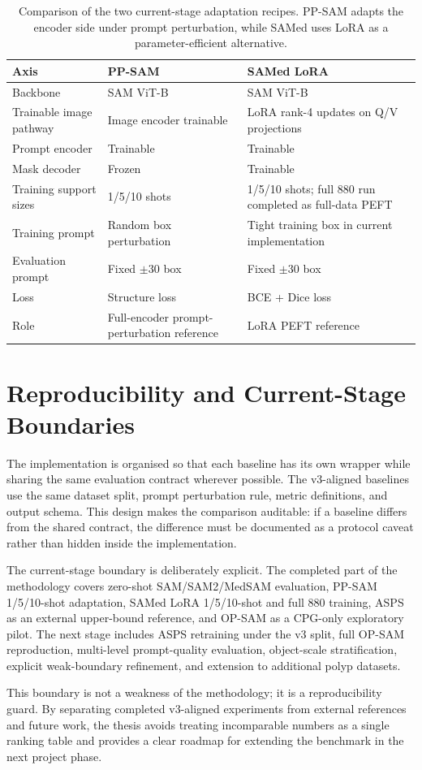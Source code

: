 \begin{table}[H]
\centering
\caption{Comparison of the two current-stage adaptation recipes. PP-SAM adapts the encoder side under prompt perturbation, while SAMed uses LoRA as a parameter-efficient alternative.}
\label{tab:adaptation-recipes}
\begin{tabular}{p{3.3cm}p{5.2cm}p{5.2cm}}
\toprule
\textbf{Axis} & \textbf{PP-SAM} & \textbf{SAMed LoRA} \\
\midrule
Backbone & SAM ViT-B & SAM ViT-B \\
Trainable image pathway & Image encoder trainable & LoRA rank-4 updates on Q/V projections \\
Prompt encoder & Trainable & Trainable \\
Mask decoder & Frozen & Trainable \\
Training support sizes & 1/5/10 shots & 1/5/10 shots; full 880 run completed as full-data PEFT \\
Training prompt & Random box perturbation & Tight training box in current implementation \\
Evaluation prompt & Fixed $\pm30$ box & Fixed $\pm30$ box \\
Loss & Structure loss & BCE + Dice loss \\
Role & Full-encoder prompt-perturbation reference & LoRA PEFT reference \\
\bottomrule
\end{tabular}
\end{table}

\section{Reproducibility and Current-Stage Boundaries}
\label{sec:reproducibility-boundaries}

The implementation is organised so that each baseline has its own wrapper while sharing the same evaluation contract wherever possible. The v3-aligned baselines use the same dataset split, prompt perturbation rule, metric definitions, and output schema. This design makes the comparison auditable: if a baseline differs from the shared contract, the difference must be documented as a protocol caveat rather than hidden inside the implementation.

The current-stage boundary is deliberately explicit. The completed part of the methodology covers zero-shot SAM/SAM2/MedSAM evaluation, PP-SAM 1/5/10-shot adaptation, SAMed LoRA 1/5/10-shot and full 880 training, ASPS as an external upper-bound reference, and OP-SAM as a CPG-only exploratory pilot. The next stage includes ASPS retraining under the v3 split, full OP-SAM reproduction, multi-level prompt-quality evaluation, object-scale stratification, explicit weak-boundary refinement, and extension to additional polyp datasets.

This boundary is not a weakness of the methodology; it is a reproducibility guard. By separating completed v3-aligned experiments from external references and future work, the thesis avoids treating incomparable numbers as a single ranking table and provides a clear roadmap for extending the benchmark in the next project phase.
